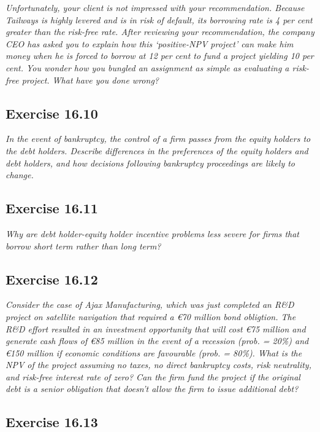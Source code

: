\documentclass[]{book}
\newcommand{\euro}{€}
\theoremstyle{definition}
\theoremstyle{definition}
\theoremstyle{remark}
\begin{document}
\emph{Unfortunately, your client is not impressed with your
recommendation. Because Tailways is highly levered and is in risk of
default, its borrowing rate is 4 per cent greater than the risk-free
rate. After reviewing your recommendation, the company CEO has asked you
to explain how this `positive-NPV project' can make him money when he is
forced to borrow at 12 per cent to fund a project yielding 10 per cent.
You wonder how you bungled an assignment as simple as evaluating a
risk-free project. What have you done wrong?} \citep[p.552]{book}

\subsection{Exercise 16.10}\label{exercise-16.10}

\emph{In the event of bankruptcy, the control of a firm passes from the
equity holders to the debt holders. Describe differences in the
preferences of the equity holders and debt holders, and how decisions
following bankruptcy proceedings are likely to change.}
\citep[p.552]{book}

\subsection{Exercise 16.11}\label{exercise-16.11}

\emph{Why are debt holder-equity holder incentive problems less severe
for firms that borrow short term rather than long term?}
\citep[p.552]{book}

\subsection{Exercise 16.12}\label{exercise-16.12}

\emph{Consider the case of Ajax Manufacturing, which was just completed
an R\&D project on satellite navigation that required a \euro{}70
million bond obligtion. The R\&D effort resulted in an investment
opportunity that will cost \euro{}75 million and generate cash flows of
\euro{}85 million in the event of a recession (prob. = 20\%) and
\euro{}150 million if economic conditions are favourable (prob. = 80\%).
What is the NPV of the project assuming no taxes, no direct bankruptcy
costs, risk neutrality, and risk-free interest rate of zero? Can the
firm fund the project if the original debt is a senior obligation that
doesn't allow the firm to issue additional debt?} \citep[p.552]{book}

\subsection{Exercise 16.13}\label{exercise-16.13}
\end{document}
